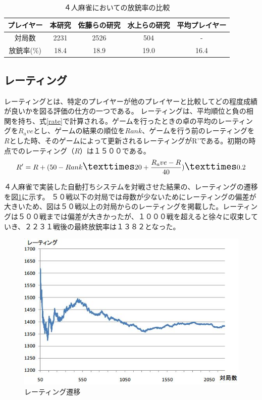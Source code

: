 \begin{table}[h]
  \caption{４人麻雀においての放銃率の比較}
  \label{tb:houzyu2231}
  \begin{center}
  \begin{tabular}{c|c|c|c|c}
    \hline
    プレイヤー   & 本研究 & 佐藤らの研究 & 水上らの研究 & 平均プレイヤー\\\hline\hline
    対局数   & 2231 & 2526 & 504 & - \\\hline
    放銃率(\%) & 18.4 & 18.9 & 19.0 & 16.4\\\hline
  \end{tabular}\end{center}
\end{table}

\subsection{レーティング}
レーティングとは、特定のプレイヤーが他のプレイヤーと比較してどの程度成績が良いかを図る評価の仕方の一つである。
レーティングは、平均順位と負の相関を持ち、式\ref{rate}で計算される。ゲームを行ったときの卓の平均のレーティングを$R_ave$とし、ゲームの結果の順位を$Rank$、ゲームを行う前のレーティングを$R$とした時、そのゲームによって更新されるレーティングがR'である。初期の時点でのレーティング（$R$）は１５００である。
\begin{equation}
\label{rate}
\Large R' = R + (50 - Rank × 20 + \displaystyle \frac{R_ave - R}{40} ) × 0.2
\end{equation}

４人麻雀で実装した自動打ちシステムを対戦させた結果の、レーティングの遷移を図\ref{rate2231}に示す。
５０戦以下の対局では母数が少ないためにレーティングの偏差が大きいため、図は５０戦以上の対局からのレーティングを掲載した。レーティングは５００戦までは偏差が大きかったが、１０００戦を超えると徐々に収束していき、２２３１戦後の最終放銃率は１３８２となった。

\begin{figure}[h]
 \centering
 \includegraphics[keepaspectratio, scale=0.8,bb=0 0 546 372]
      {img/rate2231.jpg}
 \caption{レーティング遷移}
 \label{rate2231}
\end{figure}

